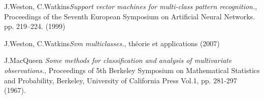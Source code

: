 \begin{thebibliography}{99}
 J.Weston, C.Watkins\emph{Support vector machines for multi-class pattern recognition.}, Proceedings of the Seventh European Symposium on Artificial Neural Networks. pp. 219–224. (1999)

 J.Weston, C.Watkins\emph{Svm multiclasses.}, théorie et applications (2007)

 J.MacQueen \emph{Some methods for classification and analysis of multivariate observations.}, Proceedings of 5th Berkeley Symposium on Mathematical Statistics and Probability, Berkeley, University of California Press Vol.1, pp. 281-297 (1967).



\end{thebibliography}

